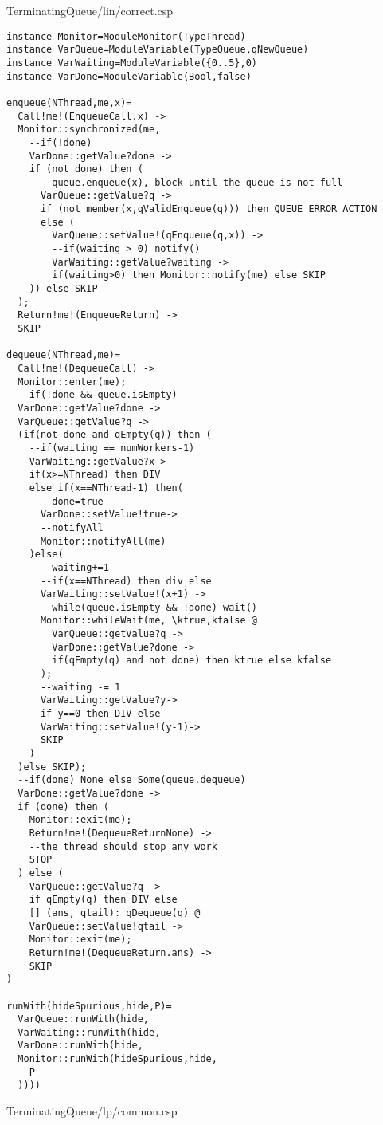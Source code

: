 TerminatingQueue/lin/correct.csp
\begin{lstlisting}
instance Monitor=ModuleMonitor(TypeThread)
instance VarQueue=ModuleVariable(TypeQueue,qNewQueue)
instance VarWaiting=ModuleVariable({0..5},0)
instance VarDone=ModuleVariable(Bool,false)

enqueue(NThread,me,x)=
  Call!me!(EnqueueCall.x) ->
  Monitor::synchronized(me,
    --if(!done)
    VarDone::getValue?done ->
    if (not done) then (
      --queue.enqueue(x), block until the queue is not full
      VarQueue::getValue?q ->
      if (not member(x,qValidEnqueue(q))) then QUEUE_ERROR_ACTION
      else (
        VarQueue::setValue!(qEnqueue(q,x)) ->
        --if(waiting > 0) notify()
        VarWaiting::getValue?waiting ->
        if(waiting>0) then Monitor::notify(me) else SKIP
    )) else SKIP
  );
  Return!me!(EnqueueReturn) ->
  SKIP
  
dequeue(NThread,me)=
  Call!me!(DequeueCall) ->
  Monitor::enter(me);
  --if(!done && queue.isEmpty)
  VarDone::getValue?done ->
  VarQueue::getValue?q ->
  (if(not done and qEmpty(q)) then (
    --if(waiting == numWorkers-1)
    VarWaiting::getValue?x->
    if(x>=NThread) then DIV
    else if(x==NThread-1) then(
      --done=true
      VarDone::setValue!true->
      --notifyAll
      Monitor::notifyAll(me)
    )else(
      --waiting+=1
      --if(x==NThread) then div else
      VarWaiting::setValue!(x+1) ->
      --while(queue.isEmpty && !done) wait()
      Monitor::whileWait(me, \ktrue,kfalse @
        VarQueue::getValue?q ->
        VarDone::getValue?done ->
        if(qEmpty(q) and not done) then ktrue else kfalse
      );
      --waiting -= 1
      VarWaiting::getValue?y->
      if y==0 then DIV else 
      VarWaiting::setValue!(y-1)->
      SKIP
    )
  )else SKIP);
  --if(done) None else Some(queue.dequeue)
  VarDone::getValue?done ->
  if (done) then (
    Monitor::exit(me);
    Return!me!(DequeueReturnNone) ->
    --the thread should stop any work
    STOP
  ) else (
    VarQueue::getValue?q ->
    if qEmpty(q) then DIV else
    [] (ans, qtail): qDequeue(q) @
    VarQueue::setValue!qtail ->
    Monitor::exit(me);
    Return!me!(DequeueReturn.ans) ->
    SKIP
)

runWith(hideSpurious,hide,P)=
  VarQueue::runWith(hide,
  VarWaiting::runWith(hide,
  VarDone::runWith(hide,
  Monitor::runWith(hideSpurious,hide,
    P
  ))))
\end{lstlisting}
TerminatingQueue/lp/common.csp

